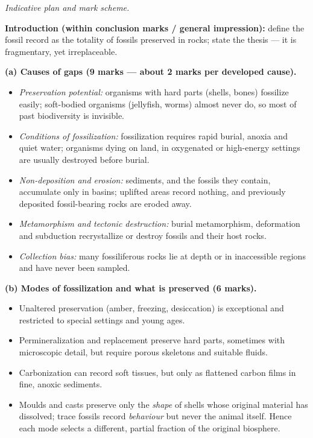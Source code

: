 \documentclass[11pt]{article}
\begin{document}
\begin{corrige}
\emph{Indicative plan and mark scheme.}

\textbf{Introduction (within conclusion marks / general impression):} define the fossil record as the totality of fossils preserved in rocks; state the thesis — it is fragmentary, yet irreplaceable.

\textbf{(a) Causes of gaps (9 marks — about 2 marks per developed cause).}
\begin{itemize}
\item \emph{Preservation potential:} organisms with hard parts (shells, bones) fossilize easily; soft-bodied organisms (jellyfish, worms) almost never do, so most of past biodiversity is invisible.
\item \emph{Conditions of fossilization:} fossilization requires rapid burial, anoxia and quiet water; organisms dying on land, in oxygenated or high-energy settings are usually destroyed before burial.
\item \emph{Non-deposition and erosion:} sediments, and the fossils they contain, accumulate only in basins; uplifted areas record nothing, and previously deposited fossil-bearing rocks are eroded away.
\item \emph{Metamorphism and tectonic destruction:} burial metamorphism, deformation and subduction recrystallize or destroy fossils and their host rocks.
\item \emph{Collection bias:} many fossiliferous rocks lie at depth or in inaccessible regions and have never been sampled.
\end{itemize}

\textbf{(b) Modes of fossilization and what is preserved (6 marks).}
\begin{itemize}
\item Unaltered preservation (amber, freezing, desiccation) is exceptional and restricted to special settings and young ages.
\item Permineralization and replacement preserve hard parts, sometimes with microscopic detail, but require porous skeletons and suitable fluids.
\item Carbonization can record soft tissues, but only as flattened carbon films in fine, anoxic sediments.
\item Moulds and casts preserve only the \emph{shape} of shells whose original material has dissolved; trace fossils record \emph{behaviour} but never the animal itself. Hence each mode selects a different, partial fraction of the original biosphere.
\end{itemize}


\end{corrige}
\end{document}
